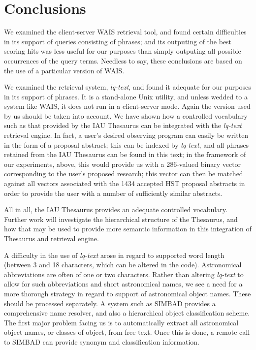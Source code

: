 \section{Conclusions}

We examined the client-server WAIS retrieval tool, and found certain
difficulties in its support of queries consisting of phrases; and 
its outputing of the best scoring hits was less useful for our purposes
than simply outputing all possible occurrences of the query terms.  
Needless to say, these conclusions are
based on the use of a particular version of WAIS.  

We examined the retrieval system, {\it lq-text}, and found it adequate
for our purposes in its support of phrases.  It is a stand-alone Unix
utility, and unless wedded to a system like WAIS, it does not run in a
client-server mode.  Again the version used by us should be taken into
account.  We have shown how a controlled vocabulary such as that provided
by the IAU Thesaurus can be integrated with the {\it lq-text} retrieval engine.
In fact, a user's desired observing program can easily be written in the 
form of a proposal abstract; this can be indexed by {\it  lq-text}, and 
all phrases retained from the IAU Thesaurus can be found in this text;
in the framework of our experiments, above, this would provide us with a 
286-valued binary vector corresponding to the user's proposed research; 
this vector can then be matched against all vectors associated with 
the 1434 accepted HST proposal abstracts in order to provide the user with 
a number of sufficiently similar abstracts. 

All in all, the IAU Thesaurus provides an adequate controlled vocabulary.
Further work will investigate the hierarchical structure of the Thesaurus,
and how that may be used to provide more semantic information in this 
integration of Thesaurus and retrieval engine. 

A difficulty in the use of {\it lq-text} 
arose in regard to supported word length (between
3 and 18 characters, which can be altered in the code).  Astronomical 
abbreviations are often of one or two characters.  Rather than altering
{\it lq-text} to allow for such abbreviations and short astronomical 
names, we see a need for a more thorough strategy in regard to support
of astronomical object names.  These should be processed separately.
A system such as SIMBAD provides a comprehensive name resolver, and 
also a hierarchical object classification scheme.  The first major problem
facing us
is to automatically extract all astronomical object names, or classes
of object, from free text.  Once this is done, a remote call to SIMBAD 
can provide synonym and classification information.

